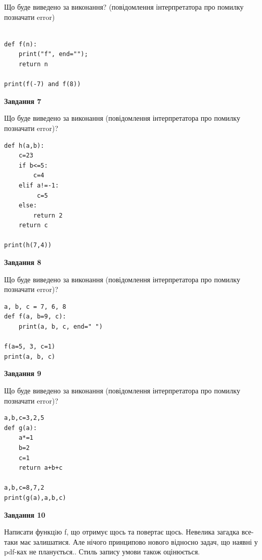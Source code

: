\documentclass[12pt, ukrainian]{article}
\begin{document}
{\begin {large}
Що буде виведено за виконання? (повідомлення інтерпретатора про помилку позначати error)\par
\begin{verbatim}

def f(n):
    print("f", end="");
    return n

print(f(-7) and f(8))
\end{verbatim}

{\begin {center}\textbf{Завдання 7}\end {center}}

Що буде виведено за виконання (повідомлення інтерпретатора про помилку позначати error)?\par
\begin{verbatim}
def h(a,b):
    c=23
    if b<=5:
        c=4
    elif a!=-1:
         c=5
    else: 
        return 2
    return c

print(h(7,4))
\end{verbatim}

{\begin {center}\textbf{Завдання 8}\end {center}}

Що буде виведено за виконання (повідомлення інтерпретатора про помилку позначати error)?\par
\begin{verbatim}
a, b, c = 7, 6, 8
def f(a, b=9, c):
    print(a, b, c, end=" ")

f(a=5, 3, c=1)
print(a, b, c)
\end{verbatim}

{\begin {center}\textbf{Завдання 9}\end {center}}

Що буде виведено за виконання (повідомлення інтерпретатора про помилку позначати error)?\par
\begin{verbatim}
a,b,c=3,2,5
def g(a):
    a*=1
    b=2
    c=1
    return a+b+c

a,b,c=8,7,2
print(g(a),a,b,c)
\end{verbatim}

{\begin {center}\textbf{Завдання 10}\end {center}}


Написати функцiю f, що отримує щось та повертає щось. Невелика загадка все-таки має залишатися. Але нічого принципово нового відносно задач, що наявні у pdf-ках не планується.. Стиль запису умови також оцінюється.\par
\end {large}}
\newpage
\end{document}
